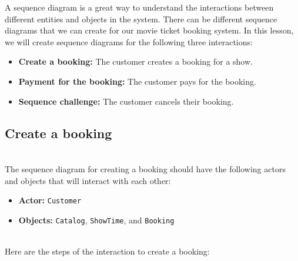 

A sequence diagram is a great way to understand the interactions between different entities and objects in the system. There can be different sequence diagrams that we can create for our movie ticket booking system. In this lesson, we will create sequence diagrams for the following three interactions:

\begin{itemize}
\item
\protect{}\label{ZJUJawTcd_XPpaVIJFw5m}
\textbf{Create a booking:} The customer creates a booking for a show.
\item
\protect{}\label{KYicwvAyYS6LiRaFLgTsL}
\textbf{Payment for the booking:} The customer pays for the booking.
\item
\protect{}\label{rUTBXBMa0ok7dBgWBQ1wo}
\textbf{Sequence challenge:} The customer cancels their booking.
\end{itemize}

\subsection{Create a booking}\label{LbzN_f8ok7Qt_oyGTJ6Kz}
\\
The sequence diagram for creating a booking should have the following actors and objects that will interact with each other:

\begin{itemize}
\item
\protect{}\label{pnHplKAxUHicDBSf2Gbh4}
\textbf{Actor:} \texttt{Customer}
\item
\protect{}\label{p0WawNydj98mGeGkkMamK}
\textbf{Objects:} \texttt{Catalog}, \texttt{ShowTime}, and \texttt{Booking}
\end{itemize}
\\
Here are the steps of the interaction to create a booking:

